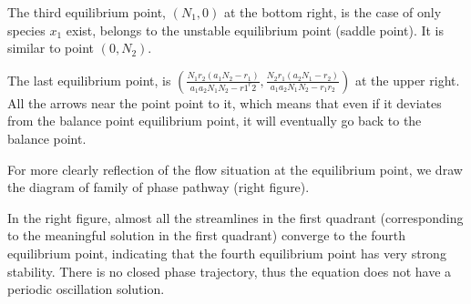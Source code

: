 \documentclass{mcmthesis}
\begin{document}
The third equilibrium point, $ (N_1,0) $ at the bottom right, is the case of only species $ x_1 $ exist, belongs to the unstable equilibrium point (saddle point). It is similar to point  $(0,N_2) $.

The last equilibrium point, is $ \left(\frac{N_{1} r_{2}\left(a_{1} N_{2}-r_{1}\right)}{a_{1} a_{2} N_{1} N_{2}-r 1^{r} 2}, \frac{N_{2} r_{1}\left(a_{2} N_{1}-r_{2}\right)}{a_{1} a_{2} N_{1} N_{2}-r_{1} r_{2}}\right)$ at the upper right.  All the arrows near the point point to it, which means that even if it deviates from the balance point equilibrium point, it will eventually go back to the balance point.

For more clearly reflection of the flow situation at the equilibrium point, we draw the diagram of family of phase pathway (right figure).

In the right figure, almost all the streamlines in the first quadrant (corresponding to the meaningful solution in the first quadrant) converge to the fourth equilibrium point, indicating that the fourth equilibrium point has very strong stability. There is no closed phase trajectory, thus the equation does not have a periodic oscillation solution.




\end{document}
